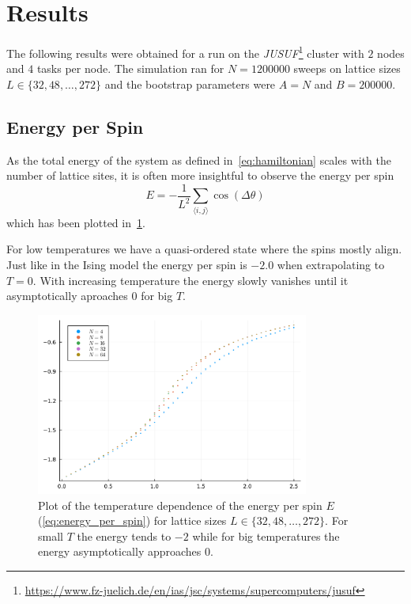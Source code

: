\section{Results}
The following results were obtained for a run on the \emph{JUSUF}\footnote{\url{https://www.fz-juelich.de/en/ias/jsc/systems/supercomputers/jusuf}} cluster with $2$ nodes and $4$ tasks per node. The simulation ran for $N = \num{1 200 000}$ sweeps on lattice sizes $L\in\{32, 48, \dots, 272\}$ and the bootstrap parameters were $A = N$ and $B = \num{200 000}$.

\subsection{Energy per Spin}
As the total energy of the system as defined in~\cref{eq:hamiltonian} scales with the number of lattice sites, it is often more insightful to observe the energy per spin
\begin{equation}\label{eq:energy_per_spin}
	E = - \frac{1}{L^2} \sum_{\langle i,j \rangle}{\cos{(\Delta \theta)}}
\end{equation}
which has been plotted in~\cref{fig:energy_per_spin}.

For low temperatures we have a quasi-ordered state where the spins mostly align. Just like in the Ising model the energy per spin is $-2.0$ when extrapolating to $T=0$. With increasing temperature the energy slowly vanishes until it asymptotically aproaches $0$ for big $T$.
\begin{figure}[ht]
	\centering
	\includegraphics[width=0.8\textwidth]{Energy.pdf}
	\caption[Temperature dependence of the energy per spin $E$]{Plot of the temperature dependence of the energy per spin $E$ (\cref{eq:energy_per_spin}) for lattice sizes $L\in\{32, 48, \dots, 272\}$. For small $T$ the energy tends to $\num{-2}$ while for big temperatures the energy asymptotically approaches $\num{0}$.}
	\label{fig:energy_per_spin}
\end{figure}

